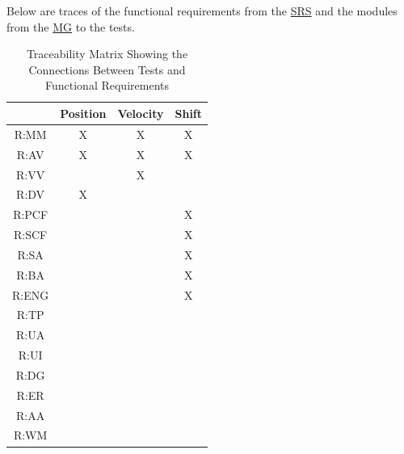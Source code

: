 \documentclass[12pt, titlepage]{article}
\begin{document}
Below are traces of the functional requirements from the \href{https://github.com/gr812b/CVT-Simulator/blob/develop/docs/SRS/SRS.pdf}{SRS}
and the modules from the \href{https://github.com/gr812b/CVT-Simulator/blob/develop/docs/Design/SoftArchitecture/MG.pdf}{MG} to the tests.

\begin{table}[h!]
  \centering
  \begin{tabular}{|c|c|c|c|}
  \hline
    & Position & Velocity & Shift \\
  \hline
  R:MM         &X&X&X \\ \hline
  R:AV         &X&X&X \\ \hline
  R:VV         & &X&  \\ \hline
  R:DV         &X& &  \\ \hline
  R:PCF        & & &X \\ \hline
  R:SCF        & & &X \\ \hline
  R:SA         & & &X \\ \hline
  R:BA         & & &X \\ \hline
  R:ENG        & & &X \\ \hline
  R:TP         & & &  \\ \hline
  R:UA         & & &  \\ \hline
  R:UI         & & &  \\ \hline
  R:DG         & & &  \\ \hline
  R:ER         & & &  \\ \hline
  R:AA         & & &  \\ \hline
  R:WM         & & &  \\ \hline
  \end{tabular}
  \caption{Traceability Matrix Showing the Connections Between Tests and Functional Requirements}
  \label{Table:trace_requirements}
  \end{table}
\end{document}
